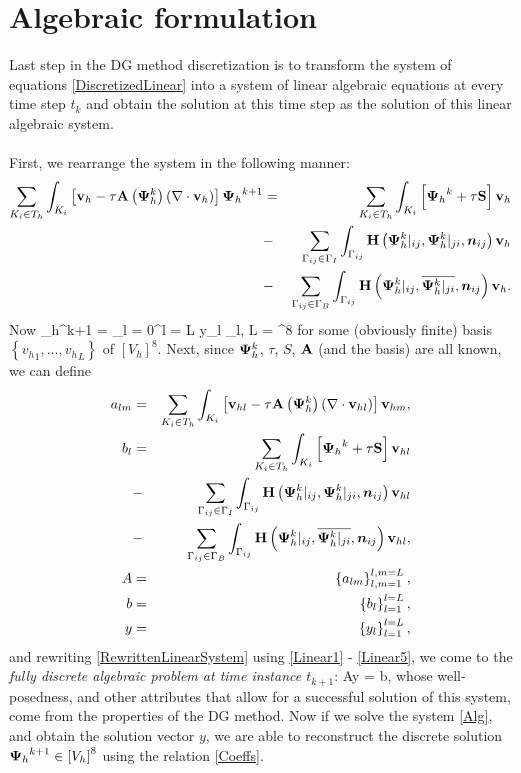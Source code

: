 \section{Algebraic formulation}
Last step in the DG method discretization is to transform the system of equations \ref{DiscretizedLinear} into a system of linear algebraic equations at every time step $t_k$ and obtain the solution at this time step as the solution of this linear algebraic system.
\paragraph{}
First, we rearrange the system in the following manner:
\begin{eqnarray}
\label{RewrittenLinearSystem} \sum_{K_i \in T_h}\int_{K_i} \left[\mathrm{\mathbf{v}}_h - \tau\mathrm{\mathbf{A}}\left({\mathrm{\mathbf{\Psi}}_h^{k}}\right) \left(\nabla \cdot \mathrm{\mathbf{v}}_h\right)\right] {\mathrm{\mathbf{\Psi}}_h}^{k+1} & = &
\sum_{K_i \in T_h}\int_{K_i} \left[{\mathrm{\mathbf{\Psi}}_h}^{k} + \tau\mathrm{\mathbf{S}}\right] \mathrm{\mathbf{v}}_h \\\nonumber& - &\sum_{\Gamma_{ij}\in\Gamma_I} \int_{\Gamma_{ij}}\mathrm{\mathbf{H}}\left({\mathrm{\mathbf{\Psi}}_h^{k}}|_{ij}, {\mathrm{\mathbf{\Psi}}_h^{k}}|_{ji}, \mbox{\boldmath $n$}_{ij}\right) \mathrm{\mathbf{v}}_h
\\\nonumber& - &\sum_{\Gamma_{ij}\in\Gamma_B} \int_{\Gamma_{ij}} \mathrm{\mathbf{H}}\left({\mathrm{\mathbf{\Psi}}_h^{k}}|_{ij}, \overline{{\mathrm{\mathbf{\Psi}}_h^{k}}|_{ji}}, \mbox{\boldmath $n$}_{ij}\right) \mathrm{\mathbf{v}}_h.
\end{eqnarray}
Now
\be
\label{Coeffs} {\mrPsi_h}^{k+1} = \sum_{l = 0}^{l = L} y_l {\mrvh}_l, L = \lo\left[V_h\right]^8\ro
\ee
for some (obviously finite) basis $\left\{{v_h}_1, ..., {v_h}_L\right\}$ of $\left[V_h\right]^8$.
Next, since $\mathrm{\mathbf{\Psi}}_h^{k}$, $\tau$, $S$, $\mathrm{\mathbf{A}}$ (and the basis) are all known, we can define
\begin{eqnarray}
\label{Linear1}
a_{lm} & = & \sum_{K_i \in T_h}\int_{K_i} \left[\mathrm{\mathbf{v}}_{hl} - \tau\mathrm{\mathbf{A}}\left({\mathrm{\mathbf{\Psi}}_h^{k}}\right) \left(\nabla \cdot \mathrm{\mathbf{v}}_{hl}\right)\right] \mathrm{\mathbf{v}}_{hm}, \\
\label{Linear2}
b_{l} & = & \sum_{K_i \in T_h}\int_{K_i} \left[{\mathrm{\mathbf{\Psi}}_h}^{k} + \tau\mathrm{\mathbf{S}}\right] \mathrm{\mathbf{v}}_{hl}\\\nonumber & - &\sum_{\Gamma_{ij}\in\Gamma_I} \int_{\Gamma_{ij}}\mathrm{\mathbf{H}}\left({\mathrm{\mathbf{\Psi}}_h^{k}}|_{ij}, {\mathrm{\mathbf{\Psi}}_h^{k}}|_{ji}, \mbox{\boldmath $n$}_{ij}\right) \mathrm{\mathbf{v}}_{hl}\\\nonumber& - &
\sum_{\Gamma_{ij}\in\Gamma_B} \int_{\Gamma_{ij}} \mathrm{\mathbf{H}}\left({\mathrm{\mathbf{\Psi}}_h^{k}}|_{ij}, \overline{{\mathrm{\mathbf{\Psi}}_h^{k}}|_{ji}}, \mbox{\boldmath $n$}_{ij}\right) \mathrm{\mathbf{v}}_{hl},\\
\label{Linear3}
A & = & \left\{a_{lm}\right\}_{l,m = 1}^{l,m = L},\\
\label{Linear4}
b & = & \left\{b_{l}\right\}_{l = 1}^{l = L},\\
y & = & \left\{y_{l}\right\}_{l = 1}^{l = L},
\label{Linear5}
\end{eqnarray}
and rewriting \ref{RewrittenLinearSystem} using \ref{Linear1} - \ref{Linear5}, we come to the \textit{fully discrete algebraic problem at time instance $t_{k+1}$}:
\be
\label{Alg} Ay = b,
\ee
whose well-posedness, and other attributes that allow for a successful solution of this system, come from the properties of the DG method.
Now if we solve the system \ref{Alg}, and obtain the solution vector $y$, we are able to reconstruct the discrete solution ${\mathrm{\mathbf{\Psi}}_h}^{k+1} \in \left[V_h\right]^8$ using the relation \ref{Coeffs}.